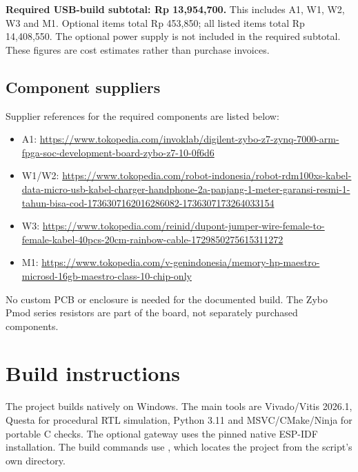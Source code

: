 \documentclass[11pt,a4paper]{article}
\newcommand{\code}[1]{\texttt{\detokenize{#1}}}
\begin{document}
\textbf{Required USB-build subtotal: Rp 13,954,700.} This includes A1, W1, W2,
W3 and M1. Optional items total Rp 453,850; all listed items total Rp 14,408,550.
The optional power supply is not included in the required subtotal. These
figures are cost estimates rather than purchase invoices.

\subsection{Component suppliers}

Supplier references for the required components are listed below:
\begin{sloppypar}
\begin{itemize}[leftmargin=1.2em,itemsep=1pt,topsep=2pt]
\item A1: \url{https://www.tokopedia.com/invoklab/digilent-zybo-z7-zynq-7000-arm-fpga-soc-development-board-zybo-z7-10-0f6d6}
\item W1/W2: \url{https://www.tokopedia.com/robot-indonesia/robot-rdm100xs-kabel-data-micro-usb-kabel-charger-handphone-2a-panjang-1-meter-garansi-resmi-1-tahun-bisa-cod-1736307162016286082-1736307173264033154}
\item W3: \url{https://www.tokopedia.com/reinid/dupont-jumper-wire-female-to-female-kabel-40pcs-20cm-rainbow-cable-1729850275615311272}
\item M1: \url{https://www.tokopedia.com/v-genindonesia/memory-hp-maestro-microsd-16gb-maestro-class-10-chip-only}
\end{itemize}
\end{sloppypar}

No custom PCB or enclosure is needed for the documented build. The Zybo Pmod
series resistors are part of the board, not separately purchased components.

\section{Build instructions}

The project builds natively on Windows. The main tools are
Vivado/Vitis 2026.1, Questa for procedural RTL simulation, Python 3.11 and
MSVC/CMake/Ninja for portable C checks. The optional gateway uses the pinned
native ESP-IDF installation. The build commands use
\code{python tools/run.py <target>}, which locates the project from the script's
own directory.
\end{document}
